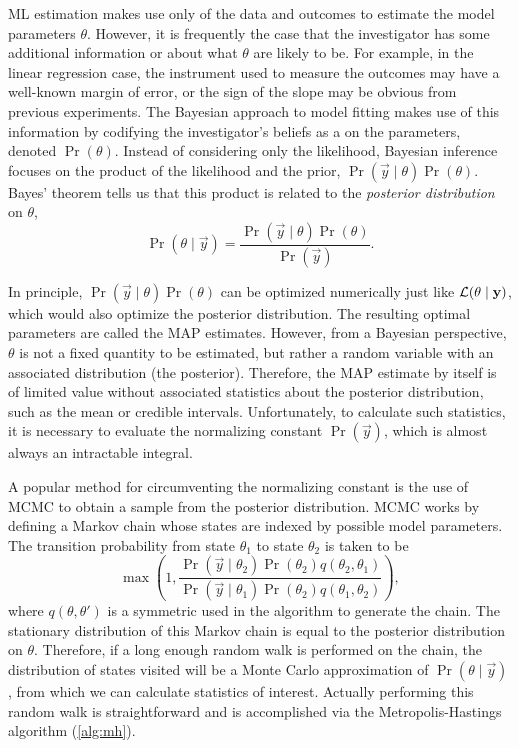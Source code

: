 \Gls{ML} estimation makes use only of the data and outcomes to estimate the
model parameters $\theta$. However, it is frequently the case that the
investigator has some additional information or  about what
$\theta$ are likely to be. For example, in the linear regression case, the
instrument used to measure the outcomes may have a well-known margin of error,
or the sign of the slope may be obvious from previous experiments. The Bayesian
approach to model fitting makes use of this information by codifying the
investigator's beliefs as a  on the parameters,
denoted $\Pr(\theta)$. Instead of considering only the likelihood, Bayesian
inference focuses on the product of the likelihood and the prior, $\Pr(\vec{y}
\mid \theta) \Pr(\theta)$. Bayes' theorem tells us that this product is related
to the \textit{posterior distribution} on $\theta$,
\[
  \Pr(\theta \mid \vec{y}) = \frac{\Pr(\vec{y} \mid \theta) \Pr(\theta)}
                                  {\Pr(\vec{y})}.
\]

In principle, $\Pr(\vec{y} \mid \theta) \Pr(\theta)$ can be optimized
numerically just like $\mathcal{L}(\theta \mid \mathbf{y})$, which would also optimize the
posterior distribution. The resulting optimal parameters are called the
\gls{MAP} estimates. However, from a Bayesian perspective, $\theta$ is not a
fixed quantity to be estimated, but rather a random variable with an associated
distribution (the posterior). Therefore, the \gls{MAP} estimate by itself is of
limited value without associated statistics about the posterior distribution,
such as the mean or credible intervals. Unfortunately, to calculate such
statistics, it is necessary to evaluate the normalizing constant
$\Pr(\vec{y})$, which is almost always an intractable integral.

A popular method for circumventing the normalizing constant is the use of
\gls{MCMC} to obtain a sample from the posterior distribution. \Gls{MCMC} works
by defining a Markov chain whose states are indexed by possible model
parameters. The transition probability from state $\theta_1$ to state
$\theta_2$ is taken to be
\[
  \max\left(1, \frac{\Pr(\vec{y} \mid \theta_2) \Pr(\theta_2) q(\theta_2, \theta_1)}
                    {\Pr(\vec{y} \mid \theta_1) \Pr(\theta_2) q(\theta_1, \theta_2)} \right),
\]
where $q(\theta, \theta')$ is a symmetric  used in
the algorithm to generate the chain. The stationary distribution of this Markov
chain is equal to the posterior distribution on $\theta$. Therefore, if a long
enough random walk is performed on the chain, the distribution of states
visited will be a Monte Carlo approximation of $\Pr(\theta \mid \vec{y})$, from
which we can calculate statistics of interest. Actually performing this random
walk is straightforward and is accomplished via the Metropolis-Hastings
algorithm (\cref{alg:mh}).

